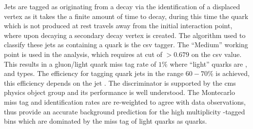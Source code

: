 Jets are tagged as originating from a \Pbottom decay via the identification of a displaced vertex as it takes the \Pbottom a finite amount of time to decay, during this time the quark which is not produced at rest travels away from the initial interaction point, where upon decaying a secondary decay vertex is created. The algorithm used to classify these jets as containing a \Pbottom quark is the \ac{csv} tagger. The ``Medium'' working point is used in the analysis, which requires at cut of $>0.679$ on the \ac{csv} value. This results in a gluon/light quark miss tag rate of $1\%$ where ``light'' quarks are \Pup, \Pdown and \Pstrange types. The efficiency for tagging \Pbottom quark jets in the range $60-70\%$\cite{ref-b-tag-eff} is achieved, this efficiency depends on the jet \PT. The discriminator is supported by the \ac{cms} \Pbottom physics object group\cite{ref-b-pog-algo} and its performance is well understood. The Montecarlo miss tag and identification rates are re-weighted to agree with data observations, thus provide an accurate background prediction for the high multiplicity \Pbottom-tagged bins which are dominated by the miss tag of light quarks as \Pbottom quarks.




\clearpage















